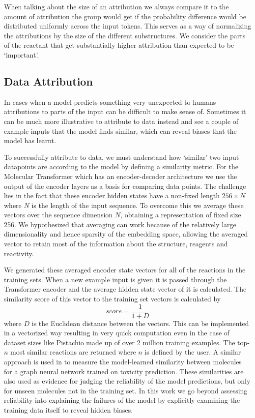 When talking about the size of an attribution we always compare it to the amount of attribution the group would get if the probability difference would be distributed uniformly across the input tokens. This serves as a way of normalizing the attributions by the size of the different substructures. We consider the parts of the reactant that get substantially higher attribution than expected to be `important'.

\subsection{Data Attribution}
In cases when a model predicts something very unexpected to humans attributions to parts of the input can be difficult to make sense of. Sometimes it can be much more illustrative to attribute to data instead and see a couple of example inputs that the model finds similar, which can reveal biases that the model has learnt.

To successfully attribute to data, we must understand how `similar' two input datapoints are according to the model by defining a similarity metric. For the Molecular Transformer which has an encoder-decoder architecture we use the output of the encoder layers as a basis for comparing data points. The challenge lies in the fact that these encoder hidden states have a non-fixed length $256\times N$ where $N$ is the length of the input sequence. To overcome this we average these vectors over the sequence dimension $N$, obtaining a representation of fixed size 256. We hypothesized that averaging can work because of the relatively large dimensionality and hence sparsity of the embedding space, allowing the averaged vector to retain most of the information about the structure, reagents and reactivity. 

We generated these averaged encoder state vectors for all of the reactions in the training sets. When a new example input is given it is passed through the Transformer encoder and the average hidden state vector of it is calculated. The similarity score of this vector to the training set vectors is calculated by
\begin{equation}
    score = \frac{1}{1 + D}
\end{equation}
where $D$ is the Euclidean distance between the vectors. This can be implemented in a vectorized way resulting in very quick computation even in the case of dataset sizes like Pistachio made up of over 2 million training examples. The top-$n$ most similar reactions are returned where $n$ is defined by the user. A similar approach is used in \cite{Allen2020} to measure the model-learned similarity between molecules for a graph neural network trained on toxicity prediction. These similarities are also used as evidence for judging the reliability of the model predictions, but only for unseen molecules not in the training set. In this work we go beyond assessing reliability into explaining the failures of the model by explicitly examining the training data itself to reveal hidden biases.

